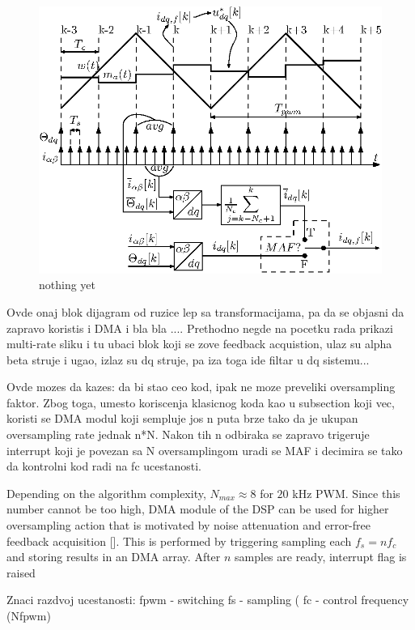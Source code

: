 \documentclass[journal]{IEEEtran}
\begin{document}
\begin{figure}[t!]
    \centerline{\includegraphics[width=0.95\linewidth]{figures/timing_diagram.eps}}
    \caption{nothing yet}
    \label{fig:timings}
\end{figure}

Ovde onaj blok dijagram od ruzice lep sa transformacijama, pa da se objasni da zapravo koristis i DMA i bla bla .... Prethodno negde na pocetku rada prikazi multi-rate sliku i tu ubaci blok koji se zove feedback acquistion, ulaz su alpha beta struje i ugao, izlaz su dq struje, pa iza toga ide filtar u dq sistemu...

Ovde mozes da kazes: da bi stao ceo kod, ipak ne moze preveliki oversampling faktor. Zbog toga, umesto koriscenja klasicnog koda kao u subsection koji vec, koristi se DMA modul koji sempluje jos n puta brze tako da je ukupan oversampling rate jednak n*N. Nakon tih n odbiraka se zapravo trigeruje interrupt koji je povezan sa N oversamplingom uradi se MAF i decimira se tako da kontrolni kod radi na fc ucestanosti.

Depending on the algorithm complexity, $N_{max} \approx 8$ for $20$ kHz PWM. Since this number cannot be too high, DMA module of the DSP can be used for higher oversampling action that is motivated by noise attenuation and error-free feedback acquisition []. This is performed by triggering sampling each $f_s = nf_c$ and storing results in an DMA array. After $n$ samples are ready, interrupt flag is raised 

Znaci razdvoj ucestanosti:
fpwm - switching
fs - sampling (
fc - control frequency (Nfpwm)
\end{document}
